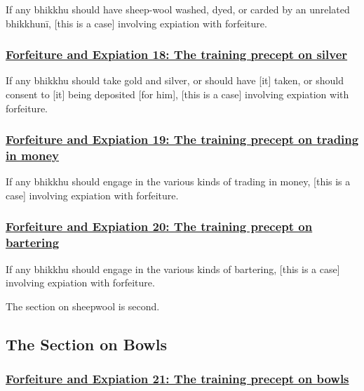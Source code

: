 If any bhikkhu should have sheep-wool washed, dyed, or carded by an unrelated bhikkhunī, [this is a case] involving expiation with forfeiture.



\subsubsection*{\hyperref[np18]{Forfeiture and Expiation 18: The training precept on silver}}
\label{forf-exp18}

If any bhikkhu should take gold and silver, or should have [it] taken, or should consent to [it] being deposited [for him], [this is a case] involving expiation with forfeiture.



\subsubsection*{\hyperref[np19]{Forfeiture and Expiation 19: The training precept on trading in money}}
\label{forf-exp19}

If any bhikkhu should engage in the various kinds of trading in money, [this is a case] involving expiation with forfeiture.



\subsubsection*{\hyperref[np20]{Forfeiture and Expiation 20: The training precept on bartering}}
\label{forf-exp20}

If any bhikkhu should engage in the various kinds of bartering, [this is a case] involving expiation with forfeiture.

The section on sheepwool is second.



\setsubsecheadstyle{\subsectionFmt}
\subsection{The Section on Bowls}

\subsubsection*{\hyperref[np21]{Forfeiture and Expiation 21: The training precept on bowls}}
\label{forf-exp21}

